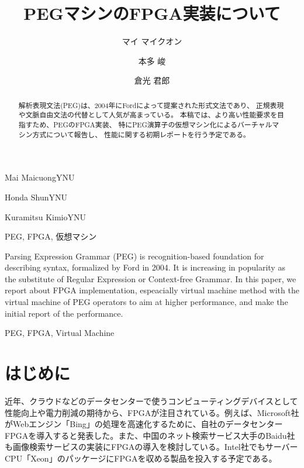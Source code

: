 \documentclass[submit,techrep]{ipsj}
\begin{document}
\title{PEGマシンのFPGA実装について}





\author{マイ マイクオン}{Mai Maicuong}{YNU} %
\author{本多 峻}{Honda Shun}{YNU}
\author{倉光 君郎}{Kuramitsu Kimio}{YNU} %

\begin{abstract}
解析表現文法(PEG)は、2004年にFordによって提案された形式文法であり、
正規表現や文脈自由文法の代替として人気が高まっている。
本稿では、より高い性能要求を目指すため、PEGのFPGA実装、
特にPEG演算子の仮想マシン化によるバーチャルマシン方式について報告し、
性能に関する初期レポートを行う予定である。
\end{abstract}


\begin{jkeyword}
PEG, FPGA, 仮想マシン
\end{jkeyword}

\begin{eabstract}
Parsing Expression Grammar (PEG) is recognition-based foundation for describing syntax, formalized by Ford in 2004. It is increasing in popularity as the substitute of Regular Expression or Context-free Grammar. In this paper, we report about FPGA implementation, espeacially virtual machine method with the virtual machine of PEG operators to aim at higher performance, and make the initial report of the performance.
\end{eabstract}

\begin{ekeyword}
PEG, FPGA, Virtual Machine
\end{ekeyword}

\maketitle

\section{はじめに}

近年、クラウドなどのデータセンターで使うコンピューティングデバイスとして性能向上や電力削減の期待から、FPGAが注目されている。例えば、Microsoft社がWebエンジン「Bing」の処理を高速化するために、自社のデータセンターFPGAを導入すると発表した。また、中国のネット検索サービス大手のBaidu社も画像検索サービスの実装にFPGAの導入を検討している。Intel社でもサーバーCPU「Xeon」のパッケージにFPGAを収める製品を投入する予定である。
\end{document}
